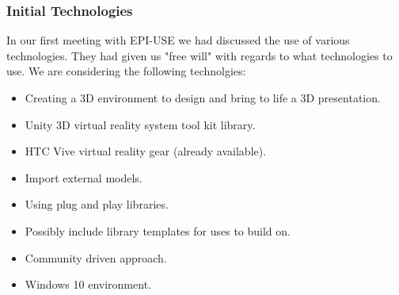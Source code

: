 \documentclass{article}
\begin{document}
	\subsubsection{Initial Technologies}
		In our first meeting with EPI-USE we had discussed the use of various technologies. They had given us "free will" with regards to what technologies to use. We are considering the following technolgies:
		\begin{itemize}
			\item Creating a 3D environment to design and bring to life a 3D presentation.
			\item Unity 3D virtual reality system tool kit library.
			\item HTC Vive virtual reality gear (already available).
			\item Import external models.
			\item Using plug and play libraries.
			\item Possibly include library templates for uses to build on.
			\item Community driven approach.
			\item Windows 10 environment.
		\end{itemize}
\end{document}
